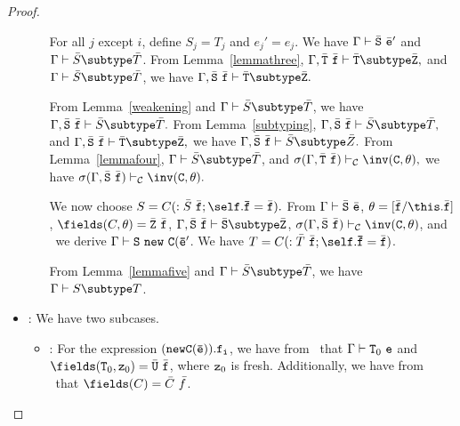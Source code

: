 \begin{proof}
\begin{itemize}
\begin{itemize}
            For all $j$ except $i$, define $S_j = T_j$ and $e_j' = e_j$.
            We have 
            $\Gamma \vdash \bar{\tt S}\ \bar{\tt e}'$ and
            $\Gamma \vdash \bar{S} \subtype \bar{T}$.
            From Lemma~\ref{lemmathree},
            $\Gamma, \bar{\tt T}\ \bar{\tt f} \vdash
                    \bar{\tt T} \subtype \bar{\tt Z},$
            and $\Gamma \vdash \bar{S} \subtype \bar{T}$, we have
            $\Gamma, \bar{\tt S}\ \bar{\tt f} \vdash
                    \bar{\tt T} \subtype \bar{\tt Z}.$

            From Lemma~\ref{weakening} and 
            $\Gamma \vdash \bar{S} \subtype \bar{T}$, 
            we have 
            $\Gamma, \bar{\tt S}\ \bar{\tt f} \vdash \bar{S} \subtype \bar{T}.$
            From Lemma~\ref{subtyping},
            $\Gamma, \bar{\tt S}\ \bar{\tt f} \vdash \bar{S} \subtype \bar{T},$
            and
            $\Gamma, \bar{\tt S}\ \bar{\tt f} \vdash
                    \bar{\tt T} \subtype \bar{\tt Z},$ we have
            $\Gamma, \bar{\tt S}\ \bar{\tt f} \vdash \bar{S} \subtype \bar{Z}.$
            From Lemma~\ref{lemmafour}, 
            $\Gamma \vdash \bar{S} \subtype \bar{T}$, and
            $\sigma(\Gamma, \bar{\tt T}\ \bar{\tt f}) \vdash_{\cal C}
                    \inv({\tt C},\theta),$
            we have
            $\sigma(\Gamma, \bar{\tt S}\ \bar{\tt f}) \vdash_{\cal C}
                    \inv({\tt C},\theta).$

            We now choose 
               $S=C(:\bar{S}\ \bar{\tt f}{\tt ;\self.\bar{f}}=\bar{\tt f}).$
            From 
            $\Gamma \vdash \bar{\tt S}\ \bar{\tt e}$,
            $\theta=[\bar{\tt f}/\this.\bar{\tt f}]$,
            $\fields(C,\theta)=\bar{\tt Z}\ \bar{\tt f}$,
            $\Gamma, \bar{\tt S}\ \bar{\tt f} \vdash
                    \bar{\tt S} \subtype \bar{\tt Z}$,
            $\sigma(\Gamma, \bar{\tt S}\ \bar{\tt f}) \vdash_{\cal C}
                    \inv({\tt C},\theta)$, and \TNew\ we derive
            $\Gamma \vdash {\tt S}\ {\tt new\ C(\bar{e}'}$.
            We have 
               $T=C(:\bar{T}\ \bar{\tt f}{\tt ;\self.\bar{f}}=\bar{\tt f})$.

            From Lemma~\ref{lemmafive} and
            $\Gamma \vdash \bar{S} \subtype \bar{T}$, we have
            $\Gamma \vdash S \subtype T$.
   \end{itemize}
\item
\TField: We have two subcases.
   \begin{itemize}
   \item
   \RField:  For the expression ${\tt (new C(\bar{e})).f_i}$, 
             we have from \TField\ that
             $\Gamma \vdash {\tt T}_0\ {\tt e}$ and
             $\fields({\tt T}_0,{\tt z}_0) = \bar{\tt U}\ \bar{\tt f}$, where
             ${\tt z}_0$ is fresh.
             Additionally, we have from \RField\ that
             $\fields(C)=\bar{C}\ \bar{f}$.


\end{itemize}
\end{itemize}
\end{proof}
